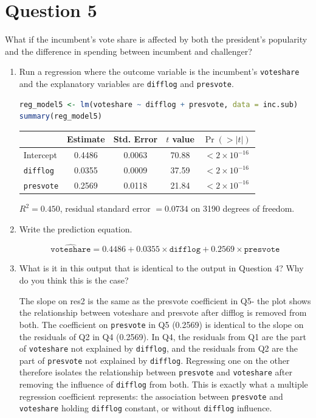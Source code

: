 \documentclass[12pt,letterpaper]{article}
\begin{document}
	\newpage	

\section*{Question 5}
\vspace{.25cm}
\noindent What if the incumbent's vote share is affected by both the president's popularity and the difference in spending between incumbent and challenger?
\begin{enumerate}

  \item Run a regression where the outcome variable is the incumbent's \texttt{voteshare} and the explanatory variables are \texttt{difflog} and \texttt{presvote}.

\begin{lstlisting}[language=R]
reg_model5 <- lm(voteshare ~ difflog + presvote, data = inc.sub)
summary(reg_model5)
\end{lstlisting}

  \begin{center}
  \begin{tabular}{lcccc}
    \hline
    & Estimate & Std. Error & $t$ value & $\Pr(>|t|)$ \\
    \hline
    Intercept & 0.4486 & 0.0063 & 70.88 & $<2\times10^{-16}$ \\
    \texttt{difflog} & 0.0355 & 0.0009 & 37.59 & $<2\times10^{-16}$ \\
    \texttt{presvote} & 0.2569 & 0.0118 & 21.84 & $<2\times10^{-16}$ \\
    \hline
  \end{tabular}
  \end{center}
  \noindent $R^2 = 0.450$, residual standard error $= 0.0734$ on 3190 degrees of freedom.

  \item Write the prediction equation.

  \[
    \widehat{\texttt{voteshare}} = 0.4486 + 0.0355 \times \texttt{difflog} + 0.2569 \times \texttt{presvote}
  \]

  \item What is it in this output that is identical to the output in Question 4? Why do you think this is the case?

  	The slope on res2 is the same as the presvote coefficient in Q5- the plot shows the relationship between voteshare and presvote after difflog is removed from both. The coefficient on \texttt{presvote} in Q5 (0.2569) is identical to the slope on the residuals of Q2 in Q4 (0.2569). In Q4, the residuals from Q1 are the part of \texttt{voteshare} not explained by \texttt{difflog}, and the residuals from Q2 are the part of \texttt{presvote} not explained by \texttt{difflog}. Regressing one on the other therefore isolates the relationship between \texttt{presvote} and \texttt{voteshare} after removing the influence of \texttt{difflog} from both. This is exactly what a multiple regression coefficient represents: the association between \texttt{presvote} and \texttt{voteshare} holding \texttt{difflog} constant, or without  \texttt{difflog} influence. 

\end{enumerate}
\end{document}
